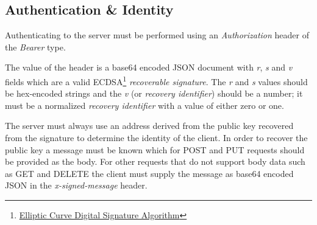 \documentclass[a4paper,titlepage,oneside]{article}
\renewcommand{\paragraph}{\small}
\begin{document}
\subsection{Authentication \& Identity}

\paragraph{Authenticating to the server must be performed using an \emph{Authorization} header of the \emph{Bearer} type.}

\paragraph{The value of the header is a base64 encoded JSON document with \emph{r}, \emph{s} and \emph{v} fields which are a valid ECDSA\footnote{\href{https://en.wikipedia.org/wiki/Elliptic_Curve_Digital_Signature_Algorithm}{Elliptic Curve Digital Signature Algorithm}} \emph{recoverable signature}. The \emph{r} and \emph{s} values should be hex-encoded strings and the \emph{v} (or \emph{recovery identifier}) should be a number; it must be a normalized \emph{recovery identifier} with a value of either zero or one.}

\paragraph{The server must always use an address derived from the public key recovered from the signature to determine the identity of the client. In order to recover the public key a message must be known which for POST and PUT requests should be provided as the body. For other requests that do not support body data such as GET and DELETE the client must supply the message as base64 encoded JSON in the \emph{x-signed-message} header.}
\end{document}
